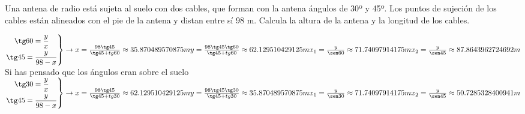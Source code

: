 \documentclass[addpoints,spanish, 12pt,a4paper]{exam}
\begin{document}
\begin{questions}
\question[2]   Una antena de radio está sujeta al suelo con dos cables, que forman con la antena ángulos de 30º y 45º. Los puntos de sujeción de los cables están alineados  con el pie de la antena  y distan entre sí 98 m.
Calcula la altura de la antena y la longitud de los cables.
\begin{solution}
$\left. \begin{gathered}
	  \tg 60 = \frac{y}{x} \\
	  \tg 45 = \frac{y}{98-x} \hfill
	 \end{gathered}  \right\rbrace \to \\
	 x=\frac{98\tg45}{\tg45+tg60}\approx35.870489570875 m\\
	 y=\frac{98\tg45\tg60}{\tg45+tg60}\approx62.129510429125 m\\
	 x_1=\frac{y}{\sen60}\approx71.74097914175 m \\
	 x_2=\frac{y}{\sen45}\approx87.8643962724692m$\\
Si has pensado que los ángulos eran sobre el suelo 
	$\left. \begin{gathered}
	  \tg 30 = \frac{y}{x} \\
	  \tg 45 = \frac{y}{98-x} \hfill
	 \end{gathered}  \right\rbrace \to \\
	 x=\frac{98\tg45}{\tg45+tg30}\approx62.129510429125 m\\
	 y=\frac{98\tg45\tg30}{\tg45+tg30}\approx35.870489570875 m\\
	 x_1=\frac{y}{\sen30}\approx71.74097914175 m \\
	 x_2=\frac{y}{\sen45}\approx50.7285328400941m$\end{solution}


\end{questions}
\end{document}
